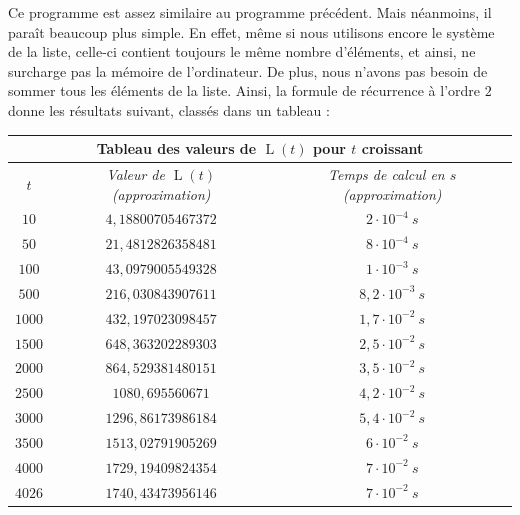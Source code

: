 \documentclass[a4paper,francais,11pt]{article}
\begin{document}
Ce programme est assez similaire au programme précédent. Mais néanmoins, il paraît beaucoup plus simple. En effet, même si nous utilisons encore le système de la liste, celle-ci contient toujours le même nombre d'éléments, et ainsi, ne surcharge pas la mémoire de l'ordinateur. De plus, nous n'avons pas besoin de sommer tous les éléments de la liste. Ainsi, la formule de récurrence à l'ordre $2$ donne les résultats suivant, classés dans un tableau :
\begin{center}
\begin{tabular}{|c||c|c|}
    \hline
    \multicolumn{3}{|c|}{\textbf{Tableau des valeurs de $\operatorname{L}\left(t\right)$ pour $t$ croissant}} \\ \hline\hline
        \multirow{1}{*}{\emph{$t$}} & \emph{Valeur de $\operatorname{L}\left(t\right)$ (approximation)} & \emph{Temps de calcul en $s$ (approximation)} \\ \hline\hline
        \multirow{1}{*}{$10$} & $4{,}18800705467372$ & $2\cdot10^{-4}\ s$ \\ \hline
        \multirow{1}{*}{$50$} & $21{,}4812826358481$ & $8\cdot10^{-4}\ s$ \\ \hline
        \multirow{1}{*}{$100$} & $43{,}0979005549328$ & $1\cdot10^{-3}\ s$ \\ \hline
        \multirow{1}{*}{$500$} & $216{,}030843907611$ & $8{,}2\cdot10^{-3}\ s$ \\ \hline
        \multirow{1}{*}{$1000$} & $432{,}197023098457$ & $1{,}7\cdot10^{-2}\ s$ \\ \hline
        \multirow{1}{*}{$1500$} & $648{,}363202289303$ & $2{,}5\cdot10^{-2}\ s$ \\ \hline
        \multirow{1}{*}{$2000$} & $864{,}529381480151$ & $3{,}5\cdot10^{-2}\ s$ \\ \hline
        \multirow{1}{*}{$2500$} & $1080{,}695560671$ & $4{,}2\cdot10^{-2}\ s$ \\ \hline
        \multirow{1}{*}{$3000$} & $1296{,}86173986184$ & $5{,}4\cdot10^{-2}\ s$ \\ \hline
        \multirow{1}{*}{$3500$} & $1513{,}02791905269$ & $6\cdot10^{-2}\ s$ \\ \hline
        \multirow{1}{*}{$4000$} & $1729{,}19409824354$ & $7\cdot10^{-2}\ s$ \\ \hline
        \multirow{1}{*}{$4026$} & $1740{,}43473956146$ & $7\cdot10^{-2}\ s$ \\
    \hline
\end{tabular}
\end{center}
\end{document}
